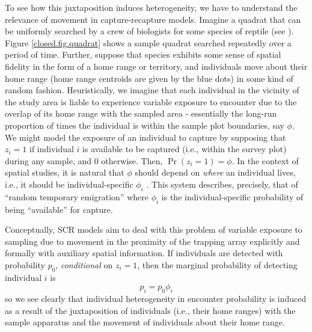 To see how this juxtaposition induces heterogeneity, we have to
understand the relevance of movement in capture-recapture models.
Imagine a quadrat that can be uniformly searched by a crew of
biologists for some species of reptile (see
\citet{royle_young:2008}).  Figure \ref{closed.fig.quadrat} shows a
sample quadrat searched repeatedly over a period of time. Further,
suppose that species exhibits some sense of spatial fidelity in the
form of a home range or territory, and individuals move about their
home range (home range centroids are given by the blue dots) in some
kind of random fashion.  
Heuristically, we imagine that each individual in
the vicinity of the study area is liable to experience variable
exposure to encounter due to the overlap of its home range with the
sampled area - essentially the long-run proportion of times the
individual is within the sample plot boundaries, say $\phi$. We
might model the exposure of an individual to capture by supposing that
$z_{i} = 1$ if individual $i$ is available to be captured (i.e.,
within the survey plot) during any sample, and $0$ otherwise. Then,
$\Pr(z_{i}=1) = \phi$.  In the context of spatial studies, it is
natural that $\phi$ should depend on {\it where} an individual lives,
i.e., it should be individual-specific $\phi_{i}$
\citep{chandler_etal:2011}. This system describes, precisely, that of
``random temporary emigration'' \citep{kendall_etal:1997} where $\phi_{i}$
is the individual-specific probability of being ``available'' for
capture.

Conceptually, SCR models aim to deal with
this problem of variable exposure to sampling due to movement in the
proximity of the trapping array explicitly and formally with auxiliary
spatial information.  If individuals are detected with probability
$p_{0}$, {\it conditional} on $z_{i} = 1$, then the marginal
probability of detecting  individual $i$ is
\[
 p_{i} = p_{0}\phi_{i}
\]
so we see clearly that individual heterogeneity in encounter
probability is induced as a result of the juxtaposition of individuals
(i.e., their home ranges) with the sample apparatus and the movement
of individuals about their home range.

